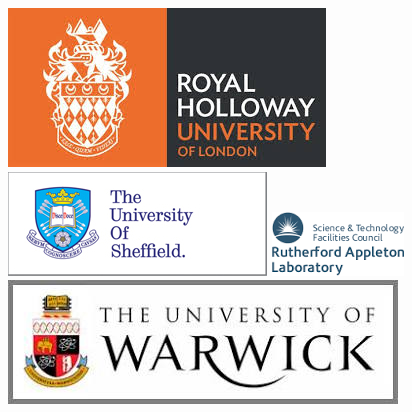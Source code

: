 \documentclass[11pt]{article}
\begin{document}
\begin{figure}[htb]
\begin{center}
\includegraphics[scale=.2]{figs/rhul.jpg}
\vspace{.2cm}
\includegraphics[scale=0.3]{figs/sheffield.png}
\hspace{.2cm}
\includegraphics[scale=0.5]{figs/RAL.png}
\vspace{.2cm}
\includegraphics[scale=.2]{figs/warwick.jpg}
\end{center}
\end{figure}
\newpage

\makeatletter
\let\toc@pre\relax
\let\toc@post\relax
\makeatother

\newpage

\newpage
{}
\setcounter{page}{1}
\label{sec:hyperk}

 


\end{document}
